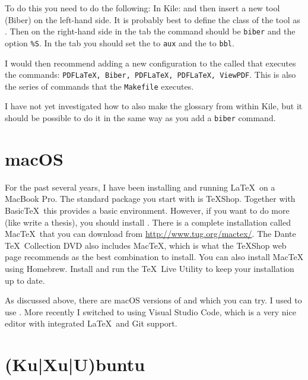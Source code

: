 To do this you need to do the following:
In Kile:  and
then insert a new tool (Biber) on the left-hand side. It is probably
best to define the class of the tool as \BibTeX. Then on the
right-hand side in the  tab the command should be
\texttt{biber} and the option \texttt{\%S}. In the 
tab you should set the  to \texttt{aux} and
the  to \texttt{bbl}.

I would then recommend adding a new configuration to the
 called  that
executes the commands: \texttt{PDFLaTeX, Biber, PDFLaTeX, PDFLaTeX,
  ViewPDF}. This is also the series of commands that the
\texttt{Makefile} executes.

I have not yet investigated how to also make the glossary from within
Kile, but it should be possible to do it in the same way as you add a
\texttt{biber} command.


\section{macOS}%
\label{sec:app:mac}

For the past several years,
I have been installing and running \LaTeX\ on a MacBook Pro.
The standard package you start with is \TeX Shop. 
Together with Basic\TeX\ this provides a basic environment. 
However, if you want to do more (like write a thesis), you should install \TeXLive.
There is a complete \TeXLive installation called Mac\TeX\ 
that you can download from \url{http://www.tug.org/mactex/}.
The Dante \TeX\ Collection DVD also includes Mac\TeX, which is what the \TeX Shop web page
recommends as the best combination to install.
You can also install Mac\TeX{} using Homebrew.
Install and run the \TeX\ Live Utility to keep your installation up to date.

As discussed above, there are macOS versions of \TeXstudio and \TeXmaker which you can try.
I used to use \TeXstudio.
More recently I switched to using Visual Studio Code,
which is a very nice editor with integrated \LaTeX\ and Git support.

\section{(Ku|Xu|U)buntu}%
\label{sec:app:kubuntu}

